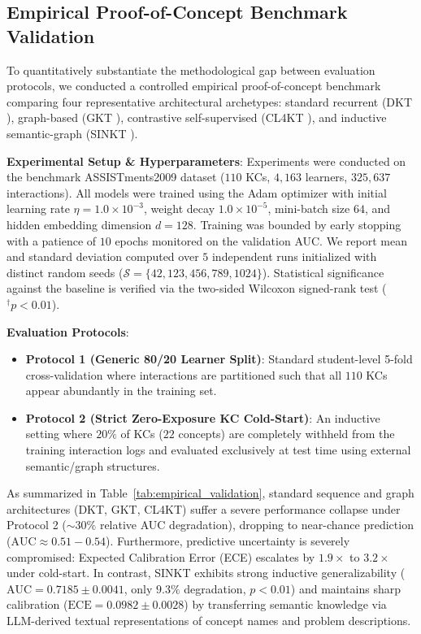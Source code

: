 ﻿\documentclass[10pt,journal,compsoc]{IEEEtran}
\begin{document}
\subsection{Empirical Proof-of-Concept Benchmark Validation}
To quantitatively substantiate the methodological gap between evaluation protocols, we conducted a controlled empirical proof-of-concept benchmark comparing four representative architectural archetypes: standard recurrent (DKT \cite{Piech_DKT_2015}), graph-based (GKT \cite{KT004_GKT_2019}), contrastive self-supervised (CL4KT \cite{KT039_CL4KT_2022}), and inductive semantic-graph (SINKT \cite{KT044_SINKT_2024}). 

\textbf{Experimental Setup \& Hyperparameters}: Experiments were conducted on the benchmark ASSISTments2009 dataset ($110$ KCs, $4,163$ learners, $325,637$ interactions). All models were trained using the Adam optimizer with initial learning rate $\eta = 1.0 \times 10^{-3}$, weight decay $1.0 \times 10^{-5}$, mini-batch size $64$, and hidden embedding dimension $d=128$. Training was bounded by early stopping with a patience of $10$ epochs monitored on the validation AUC. We report mean and standard deviation computed over $5$ independent runs initialized with distinct random seeds ($\mathcal{S} = \{42, 123, 456, 789, 1024\}$). Statistical significance against the baseline is verified via the two-sided Wilcoxon signed-rank test ($^\dagger p < 0.01$).

\textbf{Evaluation Protocols}:
\begin{itemize}
    \item \textbf{Protocol 1 (Generic 80/20 Learner Split)}: Standard student-level 5-fold cross-validation where interactions are partitioned such that all $110$ KCs appear abundantly in the training set.
    \item \textbf{Protocol 2 (Strict Zero-Exposure KC Cold-Start)}: An inductive setting where $20\%$ of KCs ($22$ concepts) are completely withheld from the training interaction logs and evaluated exclusively at test time using external semantic/graph structures.
\end{itemize}

As summarized in Table~\ref{tab:empirical_validation}, standard sequence and graph architectures (DKT, GKT, CL4KT) suffer a severe performance collapse under Protocol 2 ($\sim 30\%$ relative AUC degradation), dropping to near-chance prediction ($\text{AUC} \approx 0.51 - 0.54$). Furthermore, predictive uncertainty is severely compromised: Expected Calibration Error (ECE) escalates by $1.9\times$ to $3.2\times$ under cold-start. In contrast, SINKT exhibits strong inductive generalizability ($\text{AUC} = 0.7185 \pm 0.0041$, only $9.3\%$ degradation, $p < 0.01$) and maintains sharp calibration ($\text{ECE} = 0.0982 \pm 0.0028$) by transferring semantic knowledge via LLM-derived textual representations of concept names and problem descriptions.
\end{document}
